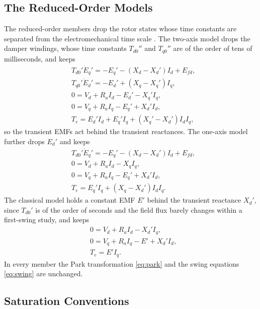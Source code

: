 \documentclass[10pt,journal]{IEEEtran}
\begin{document}
\subsection{The Reduced-Order Models}\label{ssec:reduced}

The reduced-order members drop the rotor states whose time constants are separated from the electromechanical time scale \cite{milano2010,sauer2018}.
The two-axis model drops the damper windings, whose time constants $T_{d0}''$ and $T_{q0}''$ are of the order of tens of milliseconds, and keeps
\begin{subequations}\label{eq:twoaxis}
\begin{align}
&T_{d0}'\dot E_q'=-E_q'-(X_d-X_d')I_d+E_{fd},\\
&T_{q0}'\dot E_d'=-E_d'+(X_q-X_q')I_q,\\
&0=V_d+R_aI_d-E_d'-X_q'I_q,\\
&0=V_q+R_aI_q-E_q'+X_d'I_d,\\
&T_e=E_d'I_d+E_q'I_q+(X_q'-X_d')I_dI_q,
\end{align}
\end{subequations}
so the transient EMFs act behind the transient reactances.
The one-axis model further drops $E_d'$ and keeps
\begin{subequations}\label{eq:oneaxis}
\begin{align}
&T_{d0}'\dot E_q'=-E_q'-(X_d-X_d')I_d+E_{fd},\\
&0=V_d+R_aI_d-X_qI_q,\\
&0=V_q+R_aI_q-E_q'+X_d'I_d,\\
&T_e=E_q'I_q+(X_q-X_d')I_dI_q.
\end{align}
\end{subequations}
The classical model holds a constant EMF $E'$ behind the transient reactance $X_d'$, since $T_{d0}'$ is of the order of seconds and the field flux barely changes within a first-swing study, and keeps
\begin{subequations}\label{eq:classical}
\begin{align}
&0=V_d+R_aI_d-X_d'I_q,\\
&0=V_q+R_aI_q-E'+X_d'I_d,\\
&T_e=E'I_q.
\end{align}
\end{subequations}
In every member the Park transformation \eqref{eq:park} and the swing equations \eqref{eq:swing} are unchanged.

\subsection{Saturation Conventions}\label{ssec:satconv}
\end{document}
